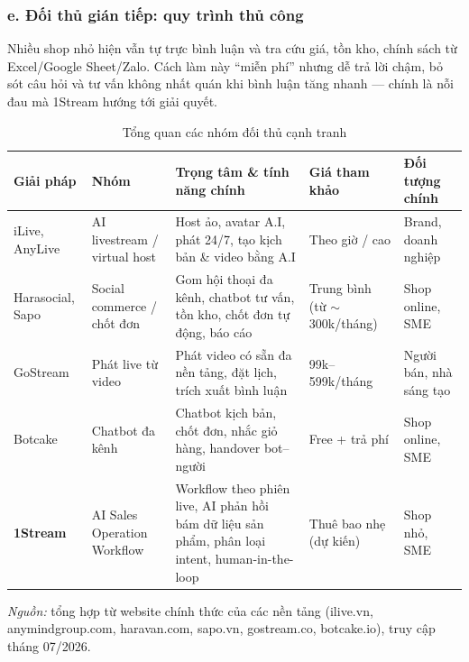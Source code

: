 \subsubsection*{e. Đối thủ gián tiếp: quy trình thủ công}
Nhiều shop nhỏ hiện vẫn tự trực bình luận và tra cứu giá, tồn kho, chính sách từ
Excel/Google Sheet/Zalo. Cách làm này ``miễn phí'' nhưng dễ trả lời chậm, bỏ sót
câu hỏi và tư vấn không nhất quán khi bình luận tăng nhanh --- chính là nỗi đau
mà 1Stream hướng tới giải quyết.

\begin{table}[ht]
    \centering
    \footnotesize
    \setlength{\tabcolsep}{4pt}
    \renewcommand{\arraystretch}{1.3}
    \caption{Tổng quan các nhóm đối thủ cạnh tranh}
    \label{tab:tong-quan-doi-thu}
    \begin{tabularx}{\linewidth}{@{}L{2.45cm}L{2.3cm}Y L{2.3cm}L{2.05cm}@{}}
        \toprule
        \textbf{Giải pháp} & \textbf{Nhóm} & \textbf{Trọng tâm \& tính năng chính}
        & \textbf{Giá tham khảo} & \textbf{Đối tượng chính} \\ \midrule
        iLive, AnyLive & AI livestream / virtual host &
        Host ảo, avatar A.I, phát 24/7, tạo kịch bản \& video bằng A.I &
        Theo giờ / cao & Brand, doanh nghiệp \\
        Harasocial, Sapo & Social commerce / chốt đơn &
        Gom hội thoại đa kênh, chatbot tư vấn, tồn kho, chốt đơn tự động, báo cáo &
        Trung bình (từ \(\sim\)300k/tháng) & Shop online, SME \\
        GoStream & Phát live từ video &
        Phát video có sẵn đa nền tảng, đặt lịch, trích xuất bình luận &
        99k--599k/tháng & Người bán, nhà sáng tạo \\
        Botcake & Chatbot đa kênh &
        Chatbot kịch bản, chốt đơn, nhắc giỏ hàng, handover bot--người &
        Free + trả phí & Shop online, SME \\
        \textbf{1Stream} & AI Sales Operation Workflow &
        Workflow theo phiên live, AI phản hồi bám dữ liệu sản phẩm, phân loại
        intent, human-in-the-loop & Thuê bao nhẹ (dự kiến) & Shop nhỏ, SME \\ \bottomrule
    \end{tabularx}

    \vspace{3pt}
    {\scriptsize \textit{Nguồn:} tổng hợp từ website chính thức của các nền tảng
    (ilive.vn, anymindgroup.com, haravan.com, sapo.vn, gostream.co, botcake.io),
    truy cập tháng 07/2026.}
\end{table}

